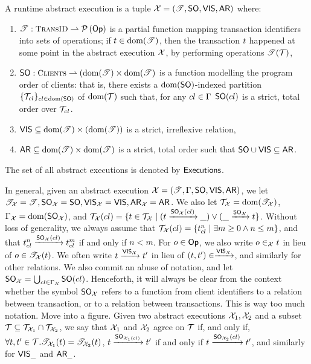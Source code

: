 \begin{definition}
A runtime abstract execution is a tuple $\mathcal{X} = (\mathscr{T}, {\sf{SO}}, {\mathsf{VIS}}, {\sf{AR}})$ where: 
\begin{enumerate}
\item $\TtoOp{T} : \TransID \rightharpoonup \powerset{\Op}$ is a partial function mapping transaction 
identifiers into sets of operations; if $t \in \operatorname{dom}(\mathscr{T})$, then the transaction $t$ happened 
at some point in the abstract execution ${\mathcal{X}}$, by performing operations $\mathscr{T}(\mathcal{T})$, 
\item $\PO: \tidset \rightharpoonup (\dom(\TtoOp{T}) \times \dom(\TtoOp{T})$ is a function modelling the 
program order of clients: that is, there exists a $\operatorname{dom}({\sf{SO}})$-indexed partition $\{\mathcal{T}_{cl}\}_{cl \in \operatorname{dom}({\sf{SO}})}$ of 
$\operatorname{dom}(\mathscr{\mathcal{T}})$ such that, for any $cl \in \Gamma$ ${\sf{SO}}(cl)$ is a strict, total order over $\mathcal{T}_{cl}$.
\item ${\mathsf{VIS}} \subseteq \operatorname{dom}(\mathscr{T}) \times (\operatorname{dom}(\mathscr{T}))$ is a strict, irreflexive relation, 
\item ${\sf{AR}} \subseteq \operatorname{dom}(\mathscr{T}) \times \operatorname{dom}(\mathscr{T})$ is a strict, total order such that ${\sf{SO}} \cup {\mathsf{VIS}} \subseteq {\sf{AR}}$.
\end{enumerate}

The set of all abstract executions is denoted by ${\mathsf{Executions}}$.
\end{definition}
In general, given an abstract execution ${\mathcal{X}} = (\mathscr{T}, \Gamma, {\sf{SO}}, {\mathsf{VIS}}, {\sf{AR}})$, we let ${\mathscr{T}}_{\mathcal{X}} = \mathscr{T}, 
 {\sf{SO}}_{\mathcal{X}} = {\sf{SO}}, {{\mathsf{VIS}}}_{\mathcal{X}} = {\mathsf{VIS}}, {\sf{AR}}_{\mathcal{X}} = {\sf{AR}}$. We also let $\mathcal{T}_{\mathcal{X}} = \operatorname{dom}(\mathscr{T}_{\mathcal{X}})$, 
 $\Gamma_{\mathcal{X}} = \operatorname{dom}({\sf{SO}}_{\mathcal{X}})$, and $\mathcal{T}_{\mathcal{X}}(cl) = \{t \in \mathcal{T}_{\mathcal{X}} \mid (t \xrightarrow{{\sf{SO}}_{\mathcal{X}}(cl)} \_) 
 \vee (\_ \xrightarrow{{\sf{SO}}_{\mathcal{X}}} t \}$. Without loss of generality, we always assume that $\mathcal{T}_{\mathcal{X}}(cl) = \{ t_{cl}^{n} \mid 
 \exists m \geq 0 \wedge n \leq m \}$, and that $t_{cl}^{n} \xrightarrow{{\sf{SO}}_{\mathcal{X}}(cl)} t_{cl}^{m}$ if and 
 only if $n < m$.
 For $o \in \mathsf{Op}$, we also write $o \in_{{\mathcal{X}}} t$ in lieu of $o \in \mathscr{T}_{\mathcal{X}}(t)$.
We often write $t \xrightarrow{{\mathsf{VIS}}_{{\mathcal{X}}}} t'$ in lieu of $(t, t') \in \xrightarrow{{\mathsf{VIS}}_{{\mathcal{X}}}}$, 
and similarly for other relations. We also commit an abuse of notation, and let ${\sf{SO}}_{{\mathcal{X}}} = 
\bigcup_{cl \in \Gamma_{\mathcal{X}}} {\sf{SO}}(cl)$. Henceforth, it will always be clear from the context 
whether the symbol ${\sf{SO}}_{\mathcal{X}}$ refers to a function from client identifiers to a relation between transaction, or to a relation
between transactions. 
\ac{This is way too much notation. Move into a figure.}
Given two abstract executions $\mathcal{X}_1, \mathcal{X}_2$ and a subset $\mathcal{T} \subseteq \mathcal{T}_{\mathcal{X}_1} \cap \mathcal{T}_{\mathcal{X}_2}$, 
we say that $\mathcal{X}_1$ and $\mathcal{X}_2$ agree on $\mathcal{T}$ if, and only if, $\forall t,t' \in \mathcal{T}. \mathscr{T}_{\mathcal{X}_1}(t) = 
\mathscr{T}_{\mathcal{X}_2}(t)$, $t \xrightarrow{{\sf{SO}}_{\mathcal{X}_1(cl)}} t'$ if and only if $t \xrightarrow{{\sf{SO}}_{\mathcal{X}_2}(cl)} 
t'$, and similarly for ${\mathsf{VIS}}_{\_}$ and ${\sf{AR}}_{\_}$.

